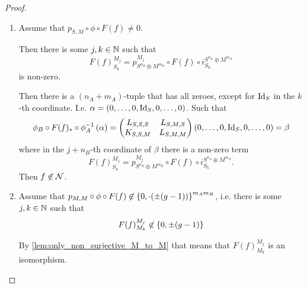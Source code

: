 \begin{proof}
\begin{enumerate}
{\begin{enumerate}
{                    Then \( f \not\in \Nc \). 
                }
                \item {
                    Assume that \( p_{S, M} \circ \phi \circ F(f) \neq 0 \).

                    Then there is some \( j, k \in {\mathbb{N}} \) such that
                    \[
                        F(f)_{S_k}^{M_j} = p_{S^{n_B} \oplus M^{m_B}}^{M_j} \circ F(f) \circ i_{S_k}^{S^{n_A} \oplus M^{m_A}}
                    \]
                    is non-zero.

                    Then there is a \( (n_A + m_A) \)-tuple that has all zeroes, except for \( \operatorname{Id}_S \) in the \( k \)-th coordinate. I.e. \( \alpha = \left( 0, \dots, 0, \operatorname{Id}_S, 0, \dots, 0 \right) \). Such that
                    \[
                        \phi_B \circ F(f)_* \circ \phi_A^{-1} \left( \alpha \right)
                        =
                        \begin{pmatrix}
                            L_{S, S, S} & L_{S, M, S} \\
                            K_{S, S, M} & L_{S, M, M}
                        \end{pmatrix}
                        \left( 0, \dots, 0, \operatorname{Id}_S, 0, \dots, 0 \right)
                        = \beta
                    \]
                    where in the \( j + n_B \)-th coordinate of \( \beta \) there is a non-zero term
                    \[
                        F(f)_{S_k}^{M_j} = p_{S^{n_B} \oplus M^{m_B}}^{M_j} \circ F(f) \circ i_{S_k}^{S^{n_A} \oplus M^{m_A}}.
                    \]
                    Then \( f \not\in \Nc \).
                }
                \item {
                    Assume that \( p_{M, M} \circ \phi \circ F(f) \not\in \left\{ 0, \cdot(\pm (g - 1)) \right\}^{m_A m_B} \), i.e. there is some \( j, k \in {\mathbb{N}} \) such that
                    \[
                        F(f)_{M_k}^{M_j} \not\in \left\{ 0, \pm(g - 1) \right\}
                    \]

                    By \autoref{lem:only_non_surjective_M_to_M} that means that \( F(f)_{M_k}^{M_j} \) is an isomorphism.

}
\end{enumerate}}
\end{enumerate}
\end{proof}
